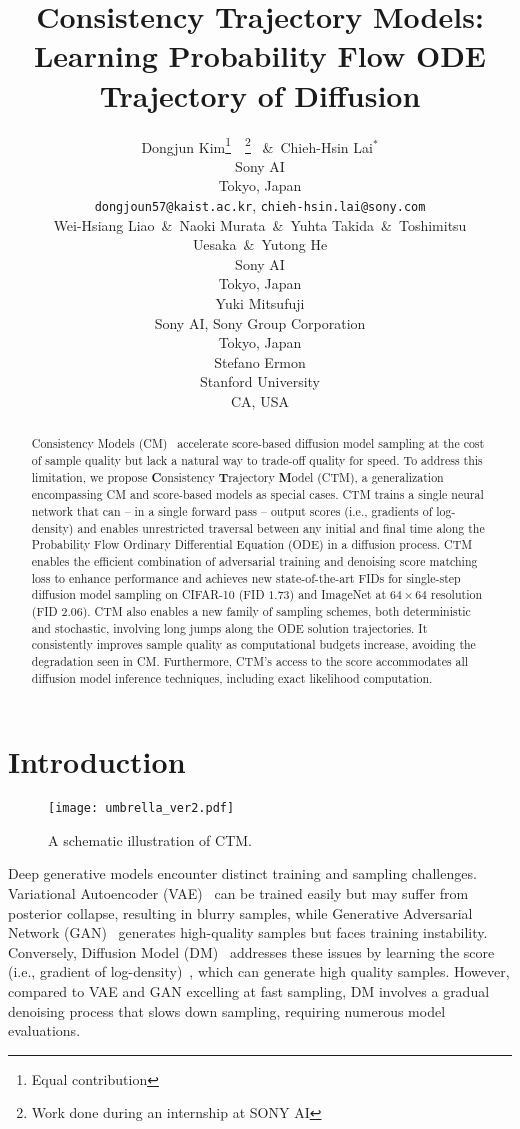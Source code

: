 \documentclass{article} \usepackage{iclr2024_coNFErence,times}
\title{Consistency Trajectory Models: Learning Probability Flow ODE Trajectory of Diffusion}
\author{Dongjun Kim\thanks{Equal contribution}~~\thanks{Work done during an internship at SONY AI} ~\&~Chieh-Hsin Lai$^{*}$ \\
Sony AI\\
Tokyo, Japan \\
\texttt{dongjoun57@kaist.ac.kr}, \texttt{chieh-hsin.lai@sony.com} \\
\And
Wei-Hsiang Liao~\&~Naoki Murata~\&~Yuhta Takida~\&~Toshimitsu Uesaka~\&~Yutong He \\
Sony AI \\
Tokyo, Japan \\
\AND
Yuki Mitsufuji \\
Sony AI, Sony Group Corporation \\
Tokyo, Japan \\
\AND
Stefano Ermon \\
Stanford University \\
CA, USA \\
}
\theoremstyle{definition}
\theoremstyle{remark}
\begin{document}
\maketitle
\doparttoc
	\parttoc

\begin{abstract}
Consistency Models (CM)~\citep{song2023consistency}
 accelerate score-based diffusion model sampling at the cost of sample quality but lack a natural way to trade-off quality for speed. To address this limitation, we propose \textbf{C}onsistency \textbf{T}rajectory \textbf{M}odel (CTM), a generalization encompassing CM and score-based models as special cases. CTM trains a single neural network that can -- in a single forward pass -- output scores (i.e., gradients of log-density) and enables unrestricted traversal between any initial and final time along the Probability Flow Ordinary Differential Equation (ODE) in a diffusion process. CTM enables the efficient combination of adversarial training and denoising score matching loss to enhance performance and achieves new state-of-the-art FIDs for single-step diffusion model sampling on CIFAR-10 (FID $1.73$) and ImageNet at $64\times64$ resolution (FID $2.06$). CTM also enables a new family of sampling schemes, both deterministic and stochastic, involving long jumps along the ODE solution trajectories. It consistently improves sample quality as computational budgets increase, avoiding the degradation seen in CM. Furthermore, CTM's access to the score accommodates all diffusion model inference techniques, including exact likelihood computation.
\end{abstract}



\section{Introduction}\label{sec:intro}


\begin{wrapfigure}{r}{0.5\textwidth}
	\vskip -0.4in
	\centering
		\centering		\texttt{[image: umbrella\_ver2.pdf]}
	\caption{A schematic illustration of CTM.}
	\label{fig:umbrella}
 \vskip -0.4in
\end{wrapfigure}

Deep generative models encounter distinct training and sampling challenges. Variational Autoencoder (VAE)~\citep{kingma2013auto} can be trained easily but
 may suffer from posterior collapse, resulting in blurry samples, while Generative Adversarial Network (GAN)~\citep{goodfellow2014generative} generates high-quality samples but faces training instability. Conversely, Diffusion Model (DM)~\citep{sohl2015deep,ho2020denoising, song2020score} addresses these issues by learning the score (i.e., gradient of log-density)~\citep{song2019generative}, which can generate high quality samples.
However, compared to VAE and GAN excelling at fast sampling,  DM involves a gradual denoising process that slows down sampling, requiring numerous model evaluations.
\end{document}
